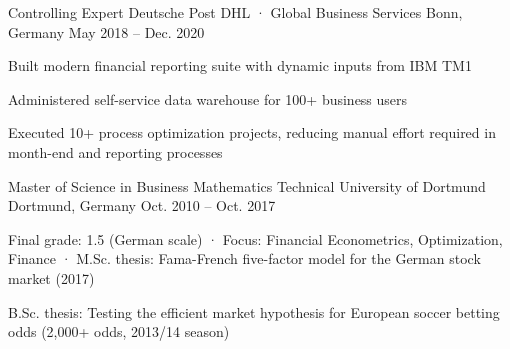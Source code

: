 \documentclass[11pt, a4paper]{awesome-cv}
\begin{document}
\begin{cventries}
  \vspace{1.0em}

  \cventry
  {Controlling Expert}
  {Deutsche Post DHL · Global Business Services}
  {Bonn, Germany}
  {May 2018 -- Dec. 2020}
  {
    \begin{cvitems}
      \item {Built modern financial reporting suite with dynamic inputs from IBM TM1}
      \item {Administered self-service data warehouse for 100+ business users}
      \item {Executed 10+ process optimization projects, reducing manual effort required in month-end and reporting processes }
    \end{cvitems}
  }
\end{cventries}




\begin{cvskills}
\end{cvskills}


\begin{cventries}
\cventry
  {Master of Science in Business Mathematics}
  {Technical University of Dortmund}
  {Dortmund, Germany}
  {Oct. 2010 -- Oct. 2017}
  {
    \begin{cvitems}
      \item {Final grade: 1.5 (German scale) · Focus: Financial Econometrics, Optimization, Finance · M.Sc. thesis: Fama-French five-factor model for the German stock market (2017)}
      \item {B.Sc. thesis: Testing the efficient market hypothesis for European soccer betting odds (2,000+ odds, 2013/14 season)}
    \end{cvitems}
  }
\end{cventries}
\end{document}
